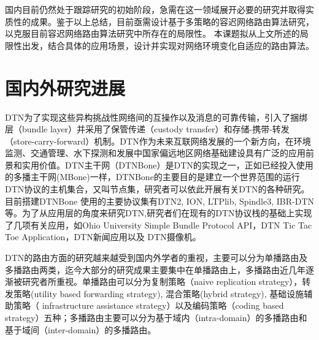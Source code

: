     国内目前仍然处于跟踪研究的初始阶段，急需在这一领域展开必要的研究并取得实质性的成果。鉴于以上总结，目前亟需设计基于多策略的容迟网络路由算法研究，以克服目前容迟网络路由算法研究中所存在的局限性。 本课题拟从上文所述的局限性出发，结合具体的应用场景，设计并实现对网络环境变化自适应的路由算法。

\section{国内外研究进展}

DTN为了实现这些异构挑战性网络间的互操作以及消息的可靠传输，引入了捆绑层（bundle layer）并采用了保管传递（custody transfer）和存储-携带-转发（store-carry-forward）机制。DTN作为未来互联网络发展的一个新方向，在环境监测、交通管理、水下探测和发展中国家偏远地区网络基础建设具有广泛的应用前景和实用价值。DTN主干网（DTNBone）是DTN的实现之一，正如已经投入使用的多播主干网(MBone)一样，DTNBone的主要目的是建立一个世界范围的运行DTN协议的主机集合，又叫节点集，研究者可以依此开展有关DTN的各种研究。目前搭建DTNBone 使用的主要协议集有DTN2, ION, LTPlib, Spindle3, IBR-DTN等。为了从应用层的角度来研究DTN,研究者们在现有的DTN协议栈的基础上实现了几项有关应用，如Ohio University Simple Bundle Protocol API，DTN Tic Tac Toe Application，DTN新闻应用以及 DTN摄像机。

DTN的路由方面的研究越来越受到国内外学者的重视，主要可以分为单播路由及多播路由两类，迄今大部分的研究成果主要集中在单播路由上，多播路由近几年逐渐被研究者所重视。单播路由可以分为复制策略（naive replication strategy），转发策略(utility based forwarding strategy), 混合策略(hybrid strategy), 基础设施辅助策略（ infrastructure assistance strategy）以及编码策略（coding based strategy）五种；多播路由主要可以分为基于域内（intra-domain）的多播路由和基于域间（inter-domain）的多播路由。

